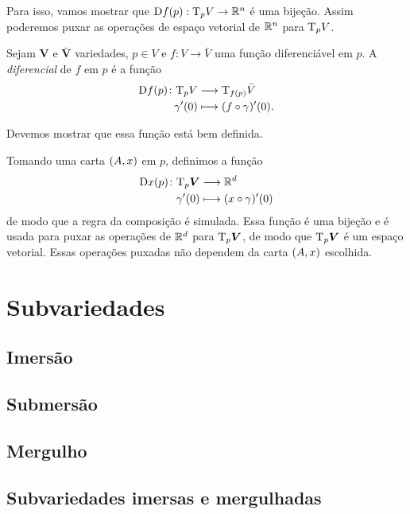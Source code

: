 Para isso, vamos mostrar que $\mathrm{D} f(p): \mathrm{T}_p V \to \mathbb{R}^n$ é uma bijeção. Assim poderemos puxar as operações de espaço vetorial de $\mathbb{R}^n$ para $\mathrm{T}_p V$.

\begin{definition}
Sejam $\bm V$ e $\bar{\bm V}$ variedades, $p \in V$ e $f: V \to \bar{V}$ uma função diferenciável em $p$. A \emph{diferencial} de $f$ em $p$ é a função
	\begin{align*}
	{\mathrm{D}f(p)}\colon {\mathrm{T}_p V} &\longrightarrow {\mathrm{T}_{f(p)} \bar V} \\{\gamma'(0)} &\longmapsto (f \circ \gamma)'(0).
	\end{align*}
\end{definition}

Devemos mostrar que essa função está bem definida.

Tomando uma carta $(A,x)$ em $p$, definimos a função
	\begin{align*}
	{\mathrm{D}x(p)}\colon {\mathrm{T}_p \bm V} &\longrightarrow {\mathbb{R}^d} \\{\gamma'(0)} &\longmapsto (x \circ \gamma)'(0)
	\end{align*}
de modo que a regra da composição é simulada. Essa função é uma bijeção e é usada para puxar as operações de $\mathbb{R}^d$ para $\mathrm{T}_p \bm V$, de modo que $\mathrm{T}_p \bm V$ é um espaço vetorial. Essas operações puxadas não dependem da carta $(A,x)$ escolhida.






\section{Subvariedades}

\subsection{Imersão}

\subsection{Submersão}

\subsection{Mergulho}

\subsection{Subvariedades imersas e mergulhadas}








